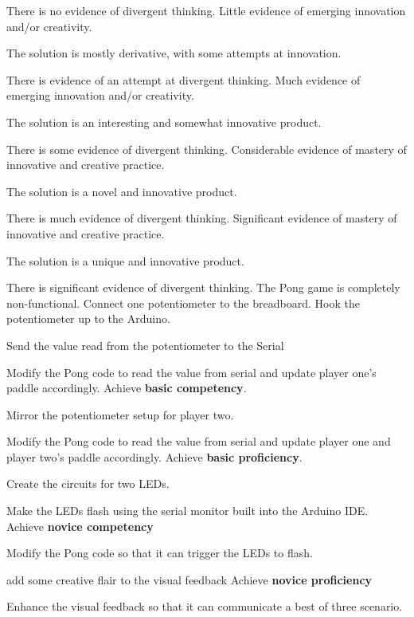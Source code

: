 \documentclass{../../fal_assignment}
\begin{document}
\begin{markingrubric}
		\par There is no evidence of divergent thinking.
		\grade Little evidence of emerging innovation and/or creativity.
		\par The solution is mostly derivative, with some attempts at innovation.
		\par There is evidence of an attempt at divergent thinking.
		\grade Much evidence of emerging innovation and/or creativity.
		\par The solution is an interesting and somewhat innovative product.
		\par There is some evidence of divergent thinking.
		\grade Considerable evidence of mastery of innovative and creative practice.
		\par The solution is a novel and innovative product.
		\par There is much evidence of divergent thinking.
		\grade Significant evidence of mastery of innovative and creative practice.
		\par The solution is a unique and innovative product.
		\par There is significant evidence of divergent thinking.
		\grade\fail The Pong game is completely non-functional.
		\grade Connect one potentiometer to the breadboard. Hook the potentiometer up to the Arduino.
		\par Send the value read from the potentiometer to the Serial
		\par Modify the Pong code to read the value from serial and update player one's paddle accordingly.
		\grade Achieve \textbf{basic competency}.
		\par Mirror the potentiometer setup for player two.
		\par Modify the Pong code to read the value from serial and update player one and player two's paddle accordingly.
		\grade Achieve \textbf{basic proficiency}.
		\par Create the circuits for two LEDs.
		\par Make the LEDs flash using the serial monitor built into the Arduino IDE.
		\grade Achieve \textbf{novice competency}
		\par Modify the Pong code so that it can trigger the LEDs to flash.
		\par add some creative flair to the visual feedback
		\grade Achieve \textbf{novice proficiency}
		\par Enhance the visual feedback so that it can communicate a best of three scenario.
	\end{markingrubric}
	
\end{document}
